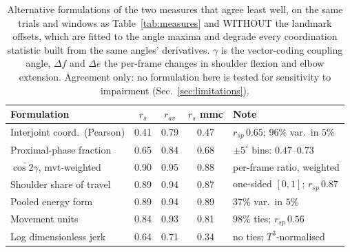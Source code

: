 \begin{table}[t]
\caption{Alternative formulations of the two measures that agree least well, on the same
trials and windows as Table~\ref{tab:measures} and WITHOUT the landmark offsets, which are
fitted to the angle maxima and degrade every coordination statistic built from the same
angles' derivatives. $\gamma$ is the vector-coding coupling angle, $\Delta f$ and $\Delta e$
the per-frame changes in shoulder flexion and elbow extension. Agreement only: no formulation
here is tested for sensitivity to impairment (Sec.~\ref{sec:limitations}).}
\label{tab:alt}
\centering
\scriptsize
\setlength{\tabcolsep}{2.5pt}
\begin{tabular}{lcccl}
\toprule
Formulation & $r_s$ & $r_{av}$ & $r_s$ mmc & Note \\
\midrule
Interjoint coord.\ (Pearson) & 0.41 & 0.79 & 0.47 & $r_{sp}\,0.65$; $96\%$ var.\ in $5\%$ \\
Proximal-phase fraction & 0.65 & 0.84 & 0.68 & $\pm5^\circ$ bins: $0.47$--$0.73$ \\
$\overline{\cos 2\gamma}$, mvt-weighted & 0.90 & 0.95 & 0.88 & per-frame ratio, weighted \\
Shoulder share of travel & 0.89 & 0.94 & 0.87 & one-sided $[0,1]$; $r_{sp}\,0.87$ \\
Pooled energy form & 0.89 & 0.94 & 0.89 & $37\%$ var.\ in $5\%$ \\
Movement units & 0.84 & 0.93 & 0.81 & $98\%$ ties; $r_{sp}\,0.56$ \\
Log dimensionless jerk & 0.64 & 0.71 & 0.34 & no ties; $T^3$-normalised \\
\bottomrule
\end{tabular}
\end{table}
